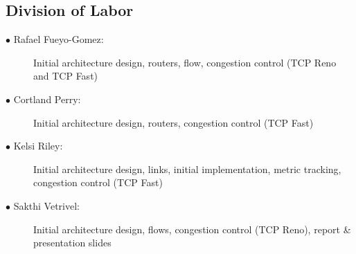 \documentclass{article}
\begin{document}
\subsection{Division of Labor}

\begin{description}
	\item[$\bullet$ Rafael Fueyo-Gomez:] Initial architecture design, routers, flow, congestion control (TCP Reno and TCP Fast)
	\item[$\bullet$ Cortland Perry:] Initial architecture design, routers, congestion control (TCP Fast)
	\item[$\bullet$ Kelsi Riley:] Initial architecture design, links, initial implementation, metric tracking, congestion control (TCP Fast)
	\item[$\bullet$ Sakthi Vetrivel:] Initial architecture design, flows, congestion control (TCP Reno), report \& presentation slides
\end{description}
\end{document}

